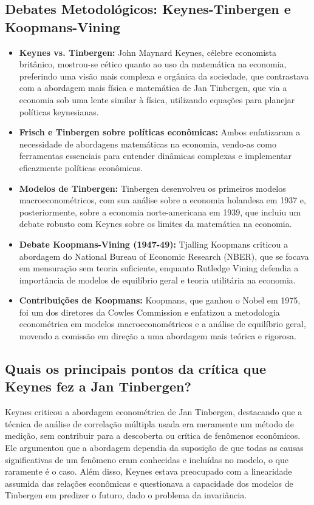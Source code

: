 \documentclass[a4paper,12pt]{article}[abntex2]
\begin{document}
\subsection{Debates Metodológicos: Keynes-Tinbergen e Koopmans-Vining}
\begin{itemize}
  \item \textbf{Keynes vs. Tinbergen:} John Maynard Keynes, célebre economista britânico, mostrou-se cético quanto ao uso da matemática na economia, preferindo uma visão mais complexa e orgânica da sociedade, que contrastava com a abordagem mais física e matemática de Jan Tinbergen, que via a economia sob uma lente similar à física, utilizando equações para planejar políticas keynesianas.
  \item \textbf{Frisch e Tinbergen sobre políticas econômicas:} Ambos enfatizaram a necessidade de abordagens matemáticas na economia, vendo-as como ferramentas essenciais para entender dinâmicas complexas e implementar eficazmente políticas econômicas.
  \item \textbf{Modelos de Tinbergen:} Tinbergen desenvolveu os primeiros modelos macroeconométricos, com sua análise sobre a economia holandesa em 1937 e, posteriormente, sobre a economia norte-americana em 1939, que incluiu um debate robusto com Keynes sobre os limites da matemática na economia.
  \item \textbf{Debate Koopmans-Vining (1947-49):} Tjalling Koopmans criticou a abordagem do National Bureau of Economic Research (NBER), que se focava em mensuração sem teoria suficiente, enquanto Rutledge Vining defendia a importância de modelos de equilíbrio geral e teoria utilitária na economia.
  \item \textbf{Contribuições de Koopmans:} Koopmans, que ganhou o Nobel em 1975, foi um dos diretores da Cowles Commission e enfatizou a metodologia econométrica em modelos macroeconométricos e a análise de equilíbrio geral, movendo a comissão em direção a uma abordagem mais teórica e rigorosa.
\end{itemize}


\subsection{\textbf{Quais os principais pontos da crítica que Keynes fez a Jan Tinbergen?}}
Keynes criticou a abordagem econométrica de Jan Tinbergen, destacando que a técnica de análise de correlação múltipla usada era meramente um método de medição, sem contribuir para a descoberta ou crítica de fenômenos econômicos. Ele argumentou que a abordagem dependia da suposição de que todas as causas significativas de um fenômeno eram conhecidas e incluídas no modelo, o que raramente é o caso. Além disso, Keynes estava preocupado com a linearidade assumida das relações econômicas e questionava a capacidade dos modelos de Tinbergen em predizer o futuro, dado o problema da invariância.
\end{document}
